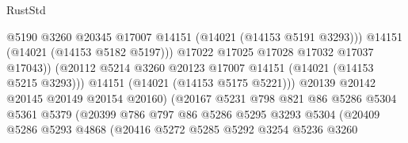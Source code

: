 \begin{lexlean}{RustStd}
\begin{coremodule}
                                            @5190
                                            @3260
                                            @20345
                                            @17007
                                            @14151
                                            (@14021 (@14153 @5191 @3293)))
                                          @14151
                                          (@14021 (@14153 @5182 @5197)))
                                        @17022
                                        @17025
                                        @17028
                                        @17032
                                        @17037
                                        @17043))
                                    (@20112
                                      @5214
                                      @3260
                                      @20123
                                      @17007
                                      @14151
                                      (@14021 (@14153 @5215 @3293)))
                                    @14151
                                    (@14021 (@14153 @5175 @5221)))
                                  @20139
                                  @20142
                                  @20145
                                  @20149
                                  @20154
                                  @20160)
                                (@20167
                                  @5231
                                  @798
                                  @821
                                  @86
                                  @5286
                                  @5304
                                  @5361
                                  @5379
                                  (@20399
                                    @786
                                    @797
                                    @86
                                    @5286
                                    @5295
                                    @3293
                                    @5304
                                    (@20409
                                      @5286
                                      @5293
                                      @4868
                                      (@20416
                                        @5272
                                        @5285
                                        @5292
                                        @3254
                                        @5236
                                        @3260

\end{coremodule}
\end{lexlean}
